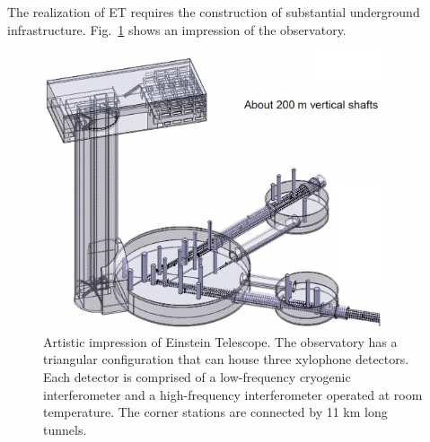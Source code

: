 The realization of ET requires the construction of substantial underground infrastructure. Fig.~\ref{fig:infra} shows an impression of the observatory.
\begin{figure}[htbp!]
	\centering
		\includegraphics[width=10cm]{./Sec_SiteInfra/Figures/infra.jpg}
		\caption{Artistic impression of Einstein Telescope. The observatory has a triangular configuration that can house three xylophone detectors. Each detector is comprised of a low-frequency cryogenic interferometer and a high-frequency interferometer operated at room temperature. The corner stations are connected by 11 km long tunnels.}
		\label{fig:infra}
\end{figure}


